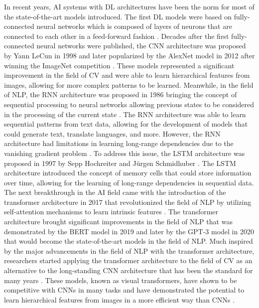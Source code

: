 \documentclass[english, 12pt, a4paper, elec, utf8, a-2b, online]{aaltothesis}
\begin{document}
In recent years, \ac{AI} systems with \ac{DL} architectures have been the norm for most of the state-of-the-art models introduced.
The first \ac{DL} models were based on fully-connected neural networks which is composed of layers of neurons that are connected to each other in a feed-forward fashion \cite{Rosenblatt1958, Rosenblatt1961}.
Decades after the first fully-connected neural networks were published, the \ac{CNN} architecture was proposed by Yann LeCun in 1998 \cite{LeCun1998} and later popularized by the AlexNet model in 2012 after winning the ImageNet competition \cite{Krizhevsky2012}.
These models represented a significant improvement in the field of \ac{CV} and were able to learn hierarchical features from images, allowing for more complex patterns to be learned.
Meanwhile, in the field of \ac{NLP}, the \ac{RNN} architecture was proposed in 1986 bringing the concept of sequential processing to neural networks allowing previous states to be considered in the processing of the current state \cite{Rumelhart1986}.
The \ac{RNN} architecture was able to learn sequential patterns from text data, allowing for the development of models that could generate text, translate languages, and more.
However, the \ac{RNN} architecture had limitations in learning long-range dependencies due to the vanishing gradient problem \cite{Hochreiter1991}.
To address this issue, the \ac{LSTM} architecture was proposed in 1997 by Sepp Hochreiter and Jürgen Schmidhuber \cite{Hochreiter1997}.
The \ac{LSTM} architecture introduced the concept of memory cells that could store information over time, allowing for the learning of long-range dependencies in sequential data.
The next breakthrough in the \ac{AI} field came with the introduction of the transformer architecture in 2017 that revolutionized the field of \ac{NLP} by utilizing self-attention mechanisms to learn intrinsic features \cite{Vaswani2017}.
The transformer architecture brought significant improvements in the field of \ac{NLP} that was demonstrated by the BERT model in 2019 \cite{Devlin2019} and later by the GPT-3 model in 2020 \cite{Brown2020} that would become the state-of-the-art models in the field of \ac{NLP}.
Much inspired by the major advancements in the field of \ac{NLP} with the transformer architecture, researchers started applying the transformer architecture to the field of \ac{CV} as an alternative to the long-standing \ac{CNN} architecture that has been the standard for many years \cite{Chen2021}.
These models, known as visual transformers, have shown to be competitive with \ac{CNN}s in many tasks and have demonstrated the potential to learn hierarchical features from images in a more efficient way than \ac{CNN}s \cite{Dosovitskiy2021}.
\end{document}
